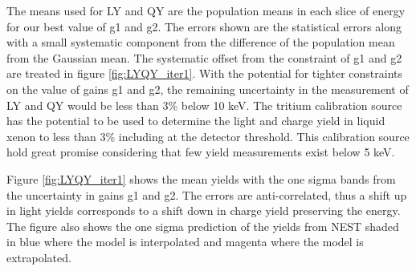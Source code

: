 The means used for LY and QY are the population means in each slice of energy for our best value of g1 and g2. The errors shown are the statistical errors along with a small systematic component from the difference of the population mean from the Gaussian mean. The systematic offset from the constraint of g1 and g2 are treated in figure \ref{fig:LYQY_iter1}. With the potential for tighter constraints on the value of gains g1 and g2, the remaining uncertainty in the measurement of LY and QY would be less than 3\% below 10 keV. The tritium calibration source has the potential to be used to determine the light and charge yield in liquid xenon to less than 3\% including at the detector threshold. This calibration source hold great promise considering that few yield measurements exist below 5 keV. 

Figure \ref{fig:LYQY_iter1} shows the mean yields with the one sigma bands from the uncertainty in gains g1 and g2. The errors are anti-correlated, thus a shift up in light yields corresponds to a shift down in charge yield preserving the energy. The figure also shows the one sigma prediction of the yields from NEST \cite{NEST_2013} shaded in blue where the model is interpolated and magenta where the model is extrapolated. 


